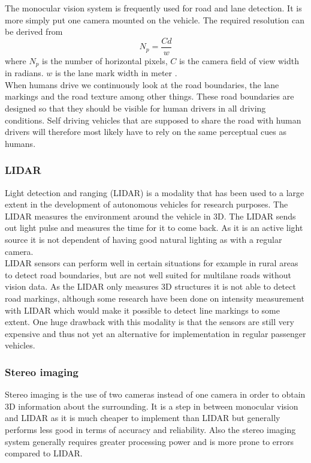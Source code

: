 The monocular vision system is frequently used for road and lane detection. It is more simply put one camera mounted on the vehicle. The required resolution can be derived from $$N_p = \frac{Cd}{w}$$where $N_p$ is the number of horizontal pixels, $C$ is the camera field of view width in radians. $w$ is the lane mark width in meter \cite{BarHillel2014}.\\

When humans drive we continuously look at the road boundaries, the lane markings and the road texture among other things. These road boundaries are designed so that they should be visible for human drivers in all driving conditions. Self driving vehicles that are supposed to share the road with human drivers will therefore most likely have to rely on the same perceptual cues as humans.

\subsubsection{LIDAR}
Light detection and ranging (LIDAR) is a modality that has been used to a large extent in the development of autonomous vehicles for research purposes. The LIDAR measures the environment around the vehicle in 3D. The LIDAR sends out light pulse and measures the time for it to come back. As it is an active light source it is not dependent of having good natural lighting as with a regular camera.\\

LIDAR sensors can perform well in certain situations for example in rural areas to detect road boundaries, \cite{BarHillel2014} but are not well suited for multilane roads without vision data. As the LIDAR only measures 3D structures it is not able to detect road markings, although some research have been done on intensity measurement with LIDAR \cite{huang2009finding} \cite{kammel2008lidar} which would make it possible to detect line markings to some extent. One huge drawback with this modality is that the sensors are still very expensive and thus not yet an alternative for implementation in regular passenger vehicles.

\subsubsection{Stereo imaging}
Stereo imaging is the use of two cameras instead of one camera in order to obtain 3D information about the surrounding. It is a step in between monocular vision and LIDAR as it is much cheaper to implement than LIDAR but generally performs less good in terms of accuracy and reliability.  Also the stereo imaging system generally requires greater processing power and is more prone to errors compared to LIDAR. 


